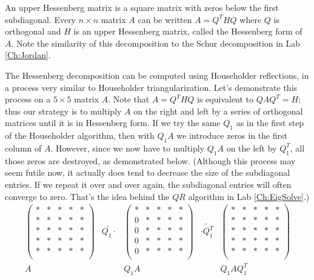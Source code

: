 An upper Hessenberg matrix is a square matrix with zeros below the first subdiagonal. 
Every  $n \times n$ matrix $A$ can be written $A = Q^THQ$ where $Q$ is orthogonal and $H$ is an upper Hessenberg matrix, 
called the Hessenberg form of $A$. 
Note the similarity of this decomposition to the Schur decomposition in Lab \ref{Ch:Jordan}. 

The Hessenberg decomposition can be computed using Householder reflections, in a process very similar to Householder triangularization. 
Let's demonstrate this process on a $5 \times 5$ matrix $A$. 
Note that $A=Q^THQ$ is equivalent to $QAQ^T = H$; thus our strategy is to multiply $A$ on the right and left by a series of orthogonal matrices until it is in Hessenberg form. 
If we try the same $Q_1$ as in the first step of the Householder algorithm, then with $Q_1 A$ we introduce zeros in the first column of $A$. 
However, since we now have to multiply $Q_1 A$ on the left by $Q_1^T$, all those zeros are destroyed, as demonstrated below. 
(Although this process may seem futile now, it actually does tend to decrease the size of the subdiagonal entries. 
If we repeat it over and over again, the subdiagonal entries will often converge to zero. 
That's the idea behind the $QR$ algorithm in Lab \ref{Ch:EigSolve}.)
\[
\begin{array}{ccccc} 
\begin{pmatrix}
* & * & * & * & *\\
* & * & * & * & *\\
* & * & * & * & *\\
* & * & * & * & *\\
* & * & * & * & *\\
\end{pmatrix} 
&\underrightarrow{Q_1 \cdot }&
\begin{pmatrix}
* & * & * & * & *\\
0 & * & * & * & *\\
0 & * & * & * & *\\
0 & * & * & * & *\\
0 & * & * & * & *\\
\end{pmatrix} 
&\underrightarrow{\cdot Q_1^T }&
\begin{pmatrix}
* & * & * & * & *\\
* & * & * & * & *\\
* & * & * & * & *\\
* & * & * & * & *\\
* & * & * & * & *\\
\end{pmatrix} 
\\ 
A & & Q_1A & & Q_1 A Q_1^T
  \end{array}
\]
